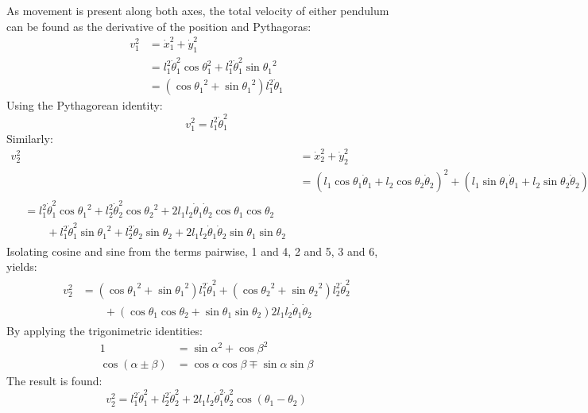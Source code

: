 As movement is present along both axes, the total velocity of either pendulum can be found as the derivative of the position and Pythagoras:
\begin{align}
	v_1^2 &= \dot{x}_1^2+\dot{y}_1^2\\
		&= l_1^2\dot{\theta}_1^2\cos{\theta}_1^2+l_1^2\dot{\theta}_1^2\sin{\theta_1}^2\\
		&= (\cos{\theta_1}^2+\sin{\theta_1}^2)l_1^2\dot{\theta}_1
\end{align}
Using the Pythagorean identity:
\begin{equation}
	\label{eq:v1}
	v_1^2 = l_1^2\dot{\theta}_1^2
\end{equation}
Similarly:
\begin{align}
	v_2^2 &= \dot{x}_2^2+\dot{y}_2^2\\
	&= (l_1\cos{\theta}_1\dot{\theta}_1 + l_2\cos{\theta_2}\dot{\theta}_2)^2+(l_1\sin{\theta}_1\dot{\theta}_1 + l_2\sin{\theta_2}\dot{\theta}_2)^2\\
	\begin{split}
		&= l_1^2\dot\theta_1^2\cos{\theta_1}^2+l_2^2\dot\theta_2^2\cos{\theta_2}^2+2l_1l_2\dot\theta_1\dot\theta_2\cos{\theta_1}\cos{\theta_2}\\
		&\qquad +l_1^2\dot\theta_1^2\sin{\theta_1}^2+l_2^2\dot\theta_2\sin{\theta_2}+2l_1l_2\dot\theta_1\dot\theta_2\sin{\theta_1}\sin{\theta_2}
	\end{split}
\end{align}
Isolating cosine and sine from the terms pairwise, 1 and 4, 2 and 5, 3 and 6, yields:
\begin{align}
	\begin{split}
		v_2^2&=(\cos{\theta_1}^2+\sin{\theta_1}^2)l_1^2\dot\theta_1^2+(\cos{\theta_2}^2+\sin{\theta_2}^2)l_2^2\dot\theta_2^2\\
	&\qquad+(\cos{\theta_1}\cos{\theta_2}+\sin{\theta_1}\sin{\theta_2})2l_1l_2\dot\theta_1\dot\theta_2
	\end{split}
\end{align}
By applying the trigonimetric identities:
\begin{align}
	1&=\sin{\alpha^2}+\cos{\beta^2}\\
	\cos{(\alpha\pm\beta)}&=\cos\alpha\cos\beta\mp\sin\alpha\sin\beta
\end{align}
The result is found:
\begin{equation}
	\label{eq:v2}
	v_2^2=l_1^2\dot\theta_1^2+l_2^2\dot\theta_2^2+2l_1l_2\dot\theta_1^2\dot\theta_2^2\cos{(\theta_1-\theta_2)}
\end{equation}
